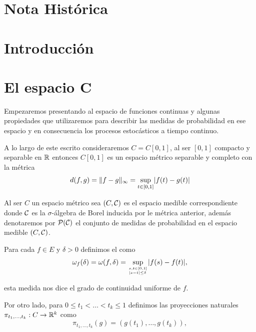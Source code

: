 \documentclass[12pt, letterpaper]{article}
\numberwithin{equation}{section}
\begin{document}

\tableofcontents


\pagebreak
\setcounter{page}{1}

\section{Nota Histórica}


\newpage

\section{Introducción}


\newpage


\section{El espacio C}
Empezaremos presentando al espacio de funciones continuas y algunas propiedades que utilizaremos para describir las medidas de probabilidad en ese espacio y en consecuencia los procesos estocásticos a tiempo continuo.

A lo largo de este escrito consideraremos $C=C[0,1]$, al ser $[0,1]$ compacto y separable en $\R$ entonces $C[0,1]$ es un espacio métrico separable y completo con la métrica 
\begin{equation*}
    d(f,g)=\lVert f-g\rVert_{\infty}=\sup_{t\in [0,1]}\lvert f(t)-g(t)\rvert
\end{equation*}

Al ser $C$ un espacio métrico sea $(C,{\cal C})$ es el espacio medible correspondiente donde ${\cal C}$ es la $\sigma$-álgebra de Borel inducida por le métrica anterior, además denotaremos por $\Po(\ca C)$ el conjunto de medidas de probabilidad en el espacio medible $(C,{\cal C})$.

Para cada $f\in E$ y $\delta>0$ definimos el  como 
\begin{equation*}
    \omega_f(\delta)=\omega(f,\delta)=\sup_{\myatop{s,t\in [0,1]}{\abs{s-t}\leq \delta}}\abs{f(s)-f(t)},
\end{equation*}

esta medida nos dice el grado de continuidad uniforme de $f$.

Por otro lado, para $0\leq t_1<\dots<t_k\leq 1$ definimos las proyecciones naturales \\ $\pi_{t_1,\dots,t_k}:C\rightarrow \R^k$ como 
\begin{equation*}
    \pi_{t_1,\dots,t_k}(g)=(g(t_1),\dots,g(t_k)),
\end{equation*}
\end{document}
